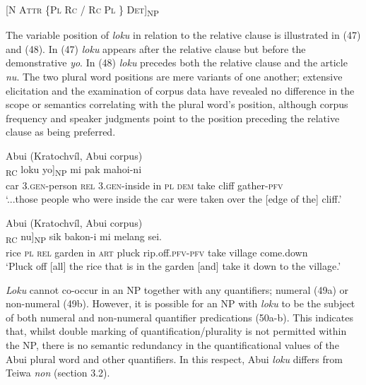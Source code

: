 [\textsc{N  Attr  \{Pl  Rc  /  Rc  Pl \} Det}]\textsubscript{NP}
\z

The variable position of \textit{loku} in relation to the relative clause is illustrated in (47) and (48). In (47) \textit{loku} appears after the relative clause but before the demonstrative \textit{yo}. In (48) \textit{loku} precedes both the relative clause and the article \textit{nu}. The two plural word positions are mere variants of one another; extensive elicitation and the examination of corpus data have revealed no difference in the scope or semantics correlating with the plural word's position, although corpus frequency and speaker judgments point to the position preceding the relative clause as being preferred.


\ea%
\label{ex:47}
Abui (Kratochv\'il, Abui corpus)\\
\gll  [...oto he-amakaang [{ba} h-omi {mia}]\textsubscript{RC} loku yo]\textsubscript{NP}  mi pak mahoi-ni \\
  car \textsc{3.gen}-person \textsc{rel} \textsc{3.gen}-inside in \textsc{pl} \textsc{dem}   take cliff gather-\textsc{pfv}  \\
\glt `...those people who were inside the car were taken over the [edge of the] cliff.'
\z













\ea%
\label{ex:48}
Abui (Kratochv\'il, Abui corpus)\\
\gll  [{Sieng} loku [{ba} uti {mia}]\textsubscript{RC} {nu}]\textsubscript{NP} sik bakon-i   mi melang sei. \\
   rice \textsc{pl} \textsc{rel} garden in \textsc{art} pluck rip.off.\textsc{pfv-pfv}   take village come.down \\
\glt `Pluck off [all] the rice that is in the garden [and] take it down to the village.'
\z












\textit{Loku} cannot co-occur in an NP together with any quantifiers; numeral (49a) or non-numeral (49b). However, it is possible for an NP with \textit{loku} to be the subject of both numeral and non-numeral quantifier predications (50a-b). This indicates that, whilst double marking of quantification/plurality is not permitted within the NP, there is no semantic redundancy in the quantificational values of the Abui plural word and other quantifiers. In this respect, Abui \textit{loku} differs from Teiwa \textit{non} (section 3.2).


